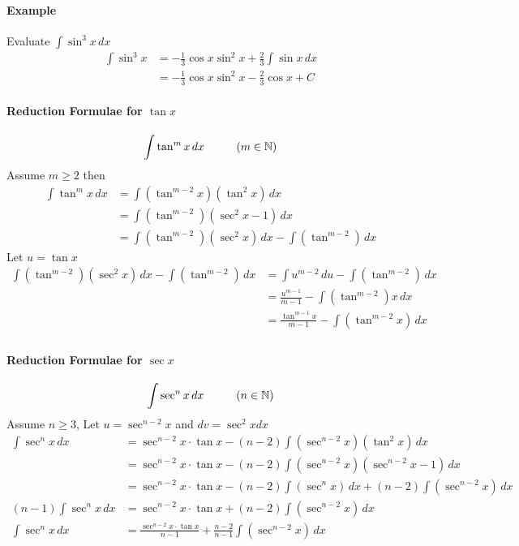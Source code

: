 \documentclass[12pt]{article}
\newcommand\tab[1][1cm]{\hspace*{#1}}
\begin{document}
\paragraph{Example} Evaluate $\int \sin^3 x \, dx$
\begin{align*} 
    \int \sin^3 x &= -\frac{1}{3} \cos x \sin^2 x + \frac{2}{3} \int \sin x \, dx \\
    &= - \frac{1}{3} \cos x \sin^2 x - \frac{2}{3} \cos x + C
\end{align*}

\paragraph{Reduction Formulae for $\tan x$} 
\[
    \int \tan^m x \, dx \textrm{\tab} (m \in \mathbb{N})
\]
Assume $m \geq 2$ then 
\begin{align*} 
    \int \tan^m x \, dx &= \int (\tan^{m - 2} x)(\tan^2 x) \, dx \\
    &= \int (\tan^{m - 2})(\sec^2 x - 1) \, dx \\
    &= \int (\tan^{m - 2})(\sec^2 x) \, dx -  \int (\tan^{m - 2}) \, dx
\end{align*}
Let $u = \tan x$
\begin{align*} 
    \int (\tan^{m - 2})(\sec^2 x) \, dx - \int (\tan^{m - 2}) \, dx &= \int u^{m - 2} \, du - \int (\tan^{m - 2}) \, dx \\
    &= \frac{u^{m - 1}}{m - 1} - \int (\tan^{m - 2}) x \, dx \\
    &= \frac{\tan^{m - 1} x}{m - 1} - \int (\tan^{m - 2} x) \, dx \\ 
\end{align*}

\paragraph{Reduction Formulae for $\sec x$} 
\[
    \int \sec^n x \, dx \textrm{\tab} (n \in \mathbb{N})
\]
Assume $n \geq 3$, Let $u = \sec^{n - 2} x$ and $dv = \sec^2 x dx$
\begin{align*} 
    \int \sec^n x \, dx &= \sec^{n - 2} x \cdot \tan x - (n - 2)\int(\sec^{n - 2} x)(\tan^2 x) \, dx \\
    &= \sec^{n - 2} x \cdot \tan x - (n - 2)\int(\sec^{n - 2} x)(\sec^{n - 2} x - 1) \, dx \\
    &= \sec^{n - 2} x \cdot \tan x - (n - 2)\int(\sec^{n} x) \, dx + (n - 2)\int(\sec^{n - 2} x) \, dx \\
    (n - 1)\int \sec^n x \, dx &=  \sec^{n - 2} x \cdot \tan x + (n - 2)\int(\sec^{n - 2} x) \, dx \\
    \int \sec^n x \, dx &= \frac{\sec^{n - 2} x \cdot \tan x}{n - 1}  + \frac{n - 2}{n- 1} \int(\sec^{n - 2} x) \, dx \\
\end{align*}
\end{document}
